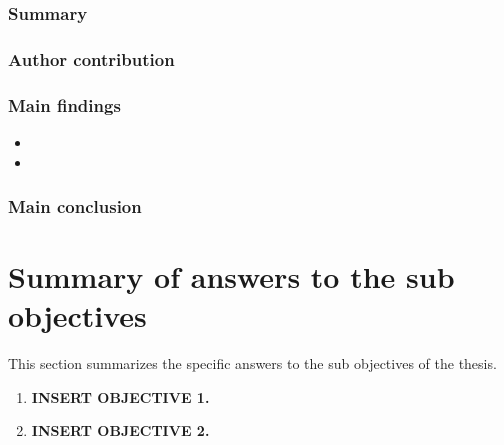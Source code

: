 \subsubsection{Summary}
\kant[10]
\subsubsection{Author contribution}
\kant[10]

\subsubsection{Main findings}
\kant[10]
\begin{itemize}
\item \kant[11]
\item \kant[12]
\end{itemize}

\subsubsection{Main conclusion}
 \kant[13]

\newpage
\section{Summary of answers to the sub objectives}\label{ch:subobj}
This section summarizes the specific answers to the sub objectives of the thesis.
\begin{enumerate}
\item \textbf{INSERT OBJECTIVE 1.}\\
  \kant[14]

        \item \textbf{INSERT OBJECTIVE 2.}\\
  \kant[14]


\end{enumerate}
